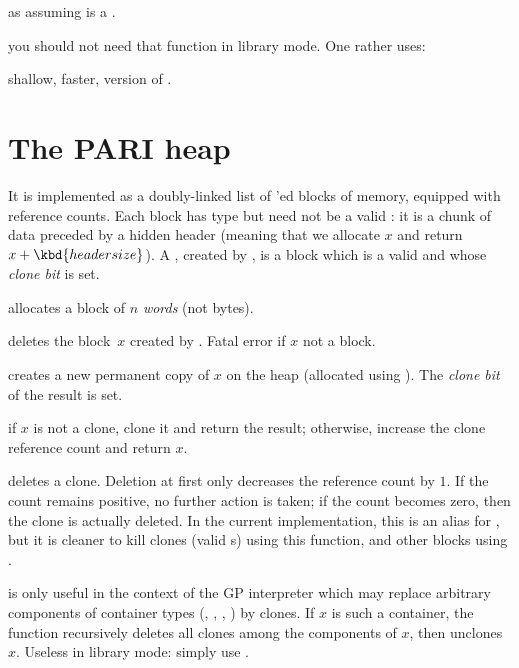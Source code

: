  as  assuming 
is a .


 you should not need that function in library mode.
One rather uses:

 shallow, faster, version of .

\section{The PARI heap}

It is implemented as a doubly-linked list of 'ed blocks of
memory, equipped with reference counts. Each block has type  but need
not be a valid : it is a chunk of data preceded by a hidden header
(meaning that we allocate $x$ and return $x + \kbd{header size}$). A
, created by , is a block which is a valid 
and whose \emph{clone bit} is set.


 allocates a block of $n$ \emph{words} (not bytes).

 deletes the block~$x$ created by .
Fatal error if $x$ not a block.

 creates a new permanent copy of $x$ on the heap
(allocated using ). The \emph{clone bit} of the result is set.

 if $x$ is not a clone, clone it and return the
result; otherwise, increase the clone reference count and return $x$.

 deletes a clone. Deletion at first only decreases
the reference count by $1$. If the count remains positive, no further action is
taken; if the count becomes zero, then the clone is actually deleted. In the
current implementation, this is an alias for , but it is cleaner
to kill clones (valid s) using this function, and other blocks using
.

 is only useful in the context of the GP
interpreter which may replace arbitrary components of container types
(, , , ) by clones. If $x$ is such
a container, the function recursively deletes all clones among the components
of $x$, then unclones $x$. Useless in library mode: simply use
.

